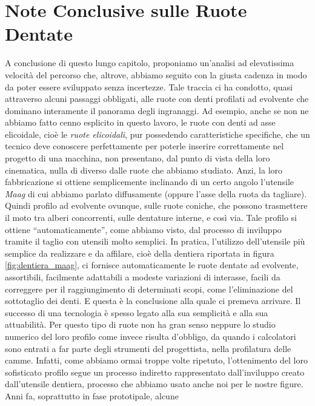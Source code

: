 \section{Note Conclusive sulle Ruote Dentate}

A conclusione di questo lungo capitolo, proponiamo un'analisi
ad elevatissima
 velocit\`a del percorso che, altrove, abbiamo seguito con la giusta
cadenza in modo da poter essere sviluppato senza incertezze. Tale traccia
ci ha condotto, quasi attraverso alcuni passaggi obbligati, alle ruote
con denti profilati ad evolvente che dominano
interamente il panorama degli ingranaggi. Ad esempio, anche se non
ne abbiamo fatto cenno esplicito in questo lavoro, le ruote con denti ad asse
elicoidale, cio\`e le {\em ruote elicoidali},
 pur possedendo caratteristiche specifiche, che un tecnico
deve conoscere perfettamente per poterle inserire correttamente 
nel progetto di una macchina, non
presentano, dal punto di vista della loro cinematica, nulla di diverso
dalle ruote che abbiamo studiato. Anzi, la loro fabbricazione si ottiene
semplicemente inclinando di un certo angolo l'utensile {\em Maag} di cui abbiamo
parlato diffusamente (oppure l'asse della ruota da tagliare).
Quindi profilo ad evolvente ovunque, sulle ruote
coniche, che possono trasmettere il moto tra alberi concorrenti, sulle dentature
interne, e cos\`i via. Tale profilo si ottiene ``automaticamente'', come abbiamo visto,
dal processo di inviluppo tramite il taglio con utensili molto semplici.
In pratica, l'utilizzo dell'utensile pi\`u semplice da realizzare e da
affilare, cio\`e della dentiera riportata in figura
\ref{fig:dentiera_maag},
 ci fornisce automaticamente le ruote dentate ad evolvente,
assortibili, facilmente adattabili a modeste variazioni di interasse,
facili da correggere per il raggiungimento di determinati scopi, come
l'eliminazione del sottotaglio dei denti.
E questa \`e
la conclusione alla quale ci premeva arrivare. Il successo di una 
tecnologia \`e spesso legato alla sua semplicit\`a e
alla sua attuabilit\`a.
Per questo tipo di  ruote non ha gran senso neppure lo studio numerico
del loro profilo come invece risulta d'obbligo,
da quando i calcolatori sono entrati a far parte degli strumenti
del progettista,  nella profilatura 
delle camme. Infatti, come abbiamo ormai troppe volte ripetuto,
l'ottenimento del loro sofisticato profilo
segue un processo
indiretto rappresentato dall'inviluppo creato dall'utensile dentiera,
processo che abbiamo usato anche noi per le nostre figure.
Anni fa, soprattutto
in fase prototipale, alcune
